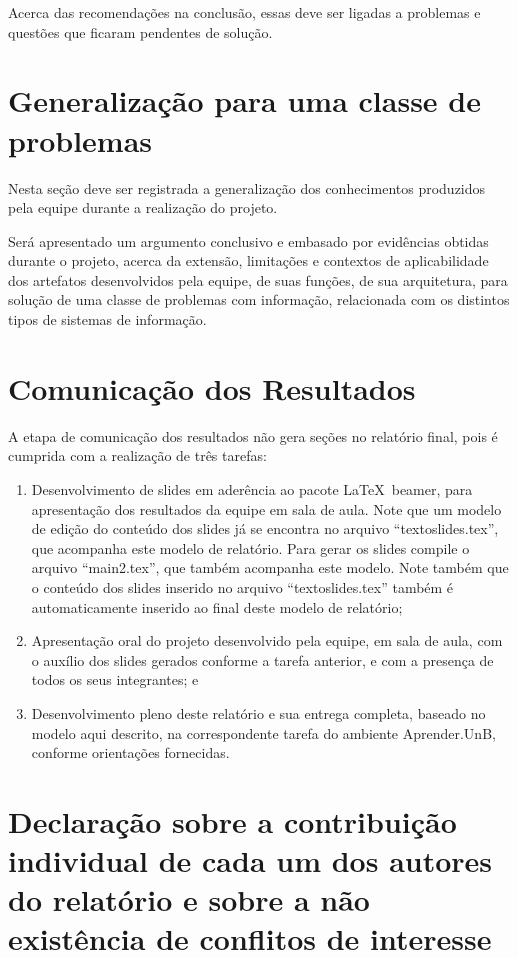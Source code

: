 \documentclass[12pt]{article}
\begin{document}
	Acerca das recomendações na conclusão, essas deve ser ligadas a problemas e questões que ficaram pendentes de solução.
	
	\section{Generalização para uma classe de problemas\label{Sec:CP:Generalizacoes}}
	
	Nesta seção deve ser registrada a generalização dos conhecimentos produzidos pela equipe durante a realização do projeto.
	
	Será apresentado um argumento conclusivo e embasado por evidências obtidas durante o projeto, acerca da extensão, limitações e contextos de aplicabilidade dos artefatos desenvolvidos pela equipe, de suas funções, de sua arquitetura, para solução de uma classe de problemas com informação, relacionada com os distintos tipos de sistemas de informação.

	\section{Comunicação dos Resultados\label{Sec:ComunicResultados}}
	
	A etapa de comunicação dos resultados não gera seções no relatório final, pois é cumprida com a realização de três tarefas:
	\begin{enumerate}
		\item Desenvolvimento de slides em aderência ao pacote \LaTeX\ beamer, para apresentação dos resultados da equipe em sala de aula. Note que um modelo de edição do conteúdo dos slides já se encontra no arquivo ``textoslides.tex'', que acompanha este modelo de relatório. Para gerar os slides compile o arquivo ``main2.tex'', que também acompanha este modelo. Note também que o conteúdo dos slides inserido no arquivo ``textoslides.tex'' também é automaticamente inserido ao final deste modelo de relatório;
		\item Apresentação oral do projeto desenvolvido pela equipe, em sala de aula, com o auxílio dos slides gerados conforme a tarefa anterior, e com a presença de todos os seus integrantes; e
		\item Desenvolvimento pleno deste relatório e sua entrega completa, baseado no modelo aqui descrito, na correspondente tarefa do ambiente Aprender.UnB, conforme orientações fornecidas.
	\end{enumerate}
	
	\section{Declaração sobre a contribuição individual de cada um dos autores do relatório e sobre a não existência de conflitos de interesse\label{Sec:DeclaracaoNaoConflito}}
	
\end{document}
